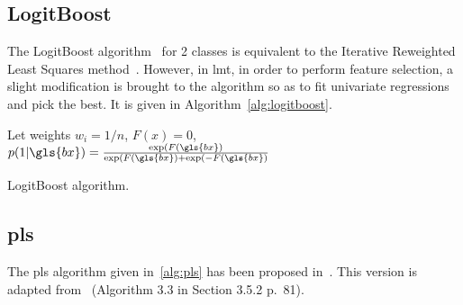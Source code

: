%
%


\subsection{LogitBoost} \label{LogitBoost}

The LogitBoost algorithm~\cite{friedman2000additive} for 2 classes is equivalent to the Iterative Reweighted Least Squares method~\cite{friedman2001elements}. However, in \gls{lmt}, in order to perform feature selection, a slight modification is brought to the algorithm so as to fit univariate regressions and pick the best. It is given in Algorithm~\ref{alg:logitboost}.

\begin{algorithm}[H]
Let weights $w_i = 1 / n$, $F(x) = 0$, $p(1 | \gls{bx}) = \frac{\exp(F(\gls{bx})}{\exp(F(\gls{bx}) + \exp(-F(\gls{bx})}$\;
 \caption{\label{alg:logitboost} LogitBoost algorithm.}
\end{algorithm}


\subsection{\gls{pls}} \label{app1:sec_pls}

The \gls{pls} algorithm given in~\eqref{alg:pls} has been proposed in~\cite{wold1984collinearity}. This version is adapted from~\cite{friedman2001elements} (Algorithm 3.3 in Section 3.5.2 p.\ 81).

